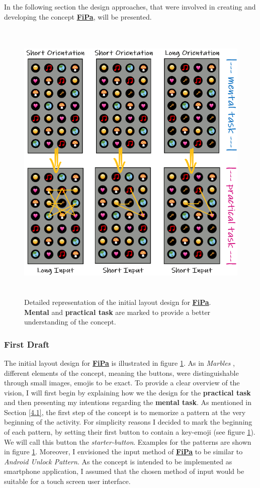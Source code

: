 In the following section the design approaches, that were involved in creating and developing the concept \underline{\textbf{FiPa}}, will be presented.

\begin{figure}[t!]
\centering
\includegraphics[width=14cm, height=14cm]{Chapters/graphics/firstdraft.PNG}
\caption{Detailed representation of the initial layout design for \underline{\textbf{FiPa}}. \textbf{Mental} and \textbf{practical task} are marked to provide a better understanding of the concept.}
\label{fig:firstdraft}
\end{figure}

\subsubsection{First Draft} \label{4.2.2.1}
The initial layout design for \underline{\textbf{FiPa}} is illustrated in figure \ref{fig:firstdraft}. As in \textit{Marbles} \cite{Marbles, anonymous}, different elements of the concept, meaning the buttons, were distinguishable through small images, emojis to be exact. To provide a clear overview of the vision, I will first begin by explaining how we the design for the \textbf{practical task} and then presenting my intentions regarding the \textbf{mental task}. As mentioned in Section \ref{4.1}, the first step of the concept is to memorize a pattern at the very beginning of the activity. For simplicity reasons I decided to mark the beginning of each pattern, by setting their first button to contain a key-emoji (see figure \ref{fig:firstdraft}). We will call this button the \textit{starter-button}. Examples for the patterns are shown in figure \ref{fig:firstdraft}. Moreover, I envisioned the input method of \underline{\textbf{FiPa}} to be similar to \textit{Android Unlock Pattern}. As the concept is intended to be implemented as smartphone application, I assumed that the chosen method of input would be suitable for a touch screen user interface. \\

